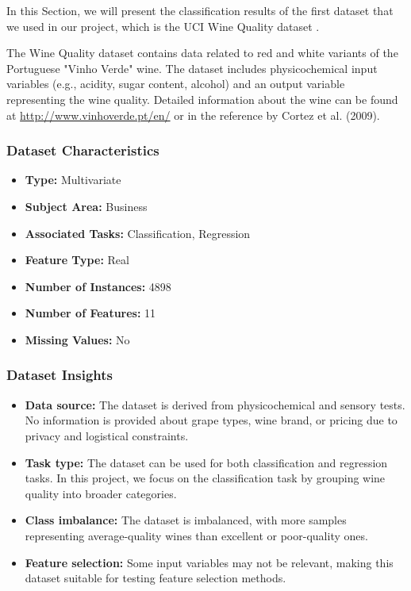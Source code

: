 \newpage
\setcounter{section}{2}
\setcounter{subsection}{0}

In this Section, we will present the classification results of the first dataset that we used in our project, which is the UCI Wine Quality dataset \cite{wine_quality}.

The Wine Quality dataset contains data related to red and white variants of the Portuguese "Vinho Verde" wine. The dataset includes physicochemical input variables (e.g., acidity, sugar content, alcohol) and an output variable representing the wine quality. Detailed information about the wine can be found at \url{http://www.vinhoverde.pt/en/} or in the reference by Cortez et al. (2009). 

\subsubsection*{Dataset Characteristics}
\begin{itemize}
    \item \textbf{Type:} Multivariate
    \item \textbf{Subject Area:} Business
    \item \textbf{Associated Tasks:} Classification, Regression
    \item \textbf{Feature Type:} Real
    \item \textbf{Number of Instances:} 4898
    \item \textbf{Number of Features:} 11
    \item \textbf{Missing Values:} No
\end{itemize}

\subsubsection*{Dataset Insights}
\begin{itemize}
    \item \textbf{Data source:} The dataset is derived from physicochemical and sensory tests. No information is provided about grape types, wine brand, or pricing due to privacy and logistical constraints.
    \item \textbf{Task type:} The dataset can be used for both classification and regression tasks. In this project, we focus on the classification task by grouping wine quality into broader categories.
    \item \textbf{Class imbalance:} The dataset is imbalanced, with more samples representing average-quality wines than excellent or poor-quality ones.
    \item \textbf{Feature selection:} Some input variables may not be relevant, making this dataset suitable for testing feature selection methods.
\end{itemize}

